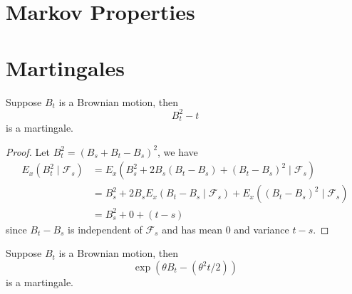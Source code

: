 \section{Markov Properties}

\section{Martingales}

\begin{example}
    Suppose $B_{t}$ is a Brownian motion, then $$B_{t}^{2}-t$$ is a martingale.
\end{example}

\begin{proof}
    Let $B_{t}^{2}=\left(B_{s}+B_{t}-B_{s}\right)^{2}$, we have
    \begin{equation*}
        \begin{aligned}
            E_{x}\left(B_{t}^{2}\mid\mathcal{F}_{s}\right) & =E_{x}\left(B_{s}^{2}+2 B_{s}\left(B_{t}-B_{s}\right)+\left(B_{t}-B_{s}\right)^{2} \mid \mathcal{F}_{s}\right)                            \\
                                                           & =B_{s}^{2}+2 B_{s} E_{x}\left(B_{t}-B_{s} \mid \mathcal{F}_{s}\right)+E_{x}\left(\left(B_{t}-B_{s}\right)^{2} \mid \mathcal{F}_{s}\right) \\
                                                           & =B_{s}^{2}+0+(t-s)
        \end{aligned}
    \end{equation*}
    since $B_{t}-B_{s}$ is independent of $\mathcal{F}_{s}$ and has mean 0 and variance $t-s$.
\end{proof}

\begin{example}
    Suppose $B_{t}$ is a Brownian motion, then $$\exp\left(\theta B_{t}-\left(\theta^{2}t/2\right)\right)$$ is a martingale.
\end{example}

